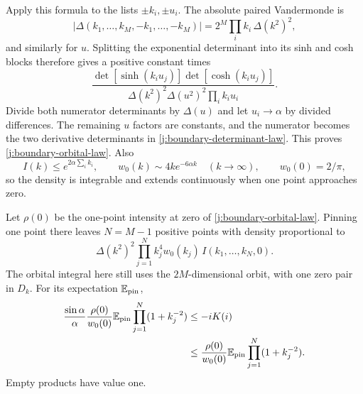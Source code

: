 Apply this formula to the lists $\pm k_i,\pm u_i$. The absolute paired
Vandermonde is
\[
 |\Delta(k_1,\ldots,k_M,-k_1,\ldots,-k_M)|
 =2^M\prod_i k_i\,\Delta(k^2)^2,
\]
and similarly for $u$. Splitting the exponential determinant into its
sinh and cosh blocks therefore gives a positive constant times
\[
 \frac{\det[\sinh(k_i u_j)]\det[\cosh(k_i u_j)]}
      {\Delta(k^2)^2\Delta(u^2)^2\prod_i k_i u_i}.
\]
Divide both numerator determinants by $\Delta(u)$ and let $u_i\to\alpha$
by divided differences. The remaining $u$ factors are constants, and
the numerator becomes the two derivative determinants in
\eqref{j:boundary-determinant-law}. This proves
\eqref{j:boundary-orbital-law}. Also
\[
 I(k)\le e^{2\alpha\sum_i k_i},\qquad
 w_0(k)\sim4k e^{-6\alpha k}\quad(k\to\infty),\qquad
 w_0(0)=2/\pi,
\]
so the density is integrable and extends continuously when one point
approaches zero.

\begin{lemma}\label{j:orbital-pin}
Let $\rho(0)$ be the one-point intensity at zero of
\eqref{j:boundary-orbital-law}. Pinning one point there leaves $N=M-1$
positive points with density proportional to
\[
 \Delta(k^2)^2\prod_{j=1}^N k_j^4w_0(k_j)\,I(k_1,\ldots,k_N,0).
\]
The orbital integral here still uses the $2M$-dimensional orbit, with one
zero pair in $D_k$. For its expectation $\mathbb E_{\rm pin}$,
\[
 \begin{aligned}
 \frac{\sin\alpha}{\alpha}\frac{\rho(0)}{w_0(0)}
   \mathbb E_{\rm pin}\prod_{j=1}^N(1+k_j^{-2})
 &\le -iK(i)\\
 &\le\frac{\rho(0)}{w_0(0)}
   \mathbb E_{\rm pin}\prod_{j=1}^N(1+k_j^{-2}).
 \end{aligned}
\]
Empty products have value one.
\end{lemma}

